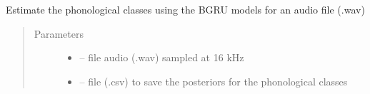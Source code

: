 \documentclass[letterpaper,10pt,english]{sphinxmanual}
\begin{document}
\begin{fulllineitems}
\begin{fulllineitems}
\begin{sphinxVerbatim}[commandchars=\\\{\}]
\PYG{p}{[}     \PYG{p}{]}
 
\end{sphinxVerbatim}

\end{fulllineitems}


\begin{fulllineitems}
\label{\detokenize{index:phonet.Phonet.get_phon_wav}}
Estimate the phonological classes using the BGRU models for an audio file (.wav)
\begin{quote}\begin{description}
\item[{Parameters}] \leavevmode\begin{itemize}
\item {} 
 -- file audio (.wav) sampled at 16 kHz

\item {} 
 -- file (.csv) to save the posteriors for the phonological classes


\end{itemize}
\end{description}
\end{quote}
\end{fulllineitems}
\end{fulllineitems}
\end{document}
